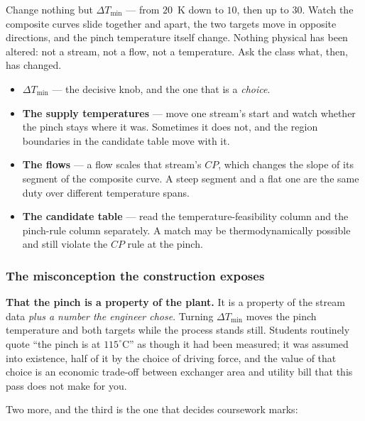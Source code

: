 \documentclass[11pt,a4paper]{article}
\begin{document}
\begin{tryit}
Change nothing but $\Delta T_{\min}$ --- from $20$~K down to $10$, then up
to $30$.  Watch the composite curves slide together and apart, the two
targets move in opposite directions, and the pinch temperature itself
change.  Nothing physical has been altered: not a stream, not a flow, not
a temperature.  Ask the class what, then, has changed.
\end{tryit}

\begin{itemize}[leftmargin=*,nosep]
  \item \textbf{$\Delta T_{\min}$} --- the decisive knob, and the one that
        is a \emph{choice}.
  \item \textbf{The supply temperatures} --- move one stream's start and
        watch whether the pinch stays where it was.  Sometimes it does
        not, and the region boundaries in the candidate table move with it.
  \item \textbf{The flows} --- a flow scales that stream's $CP$, which
        changes the slope of its segment of the composite curve.  A steep
        segment and a flat one are the same duty over different
        temperature spans.
  \item \textbf{The candidate table} --- read the temperature-feasibility
        column and the pinch-rule column separately.  A match may be
        thermodynamically possible and still violate the $CP$ rule at the
        pinch.
\end{itemize}

\subsubsection*{The misconception the construction exposes}

\begin{pitfall}
\textbf{That the pinch is a property of the plant.}  It is a property of
the stream data \emph{plus a number the engineer chose}.  Turning
$\Delta T_{\min}$ moves the pinch temperature and both targets while the
process stands still.  Students routinely quote ``the pinch is at
$115^{\circ}$C'' as though it had been measured; it was assumed into
existence, half of it by the choice of driving force, and the value of
that choice is an economic trade-off between exchanger area and utility
bill that this pass does not make for you.
\end{pitfall}

Two more, and the third is the one that decides coursework marks:
\end{document}
